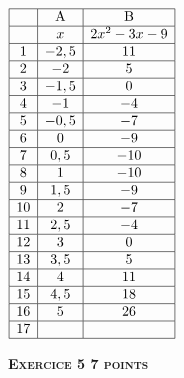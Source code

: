 \documentclass[10pt]{article}
\begin{document}
\parbox{0.3\linewidth}{$\begin{array}{|c|c|c|}\hline
	&\text{A}	&\text{B}\\ \hline
	&x			&2x^2 - 3x - 9\\ \hline
1	&- 2,5		&11\\ \hline
2	&- 2		&5\\ \hline
3	&- 1,5		&0\\ \hline
4	&- 1		&- 4\\ \hline
5	&- 0,5		&- 7\\ \hline
6	&0			&- 9\\ \hline
7	&0,5		&- 10\\ \hline
8	&1			&- 10\\ \hline
9	&1,5		&- 9\\ \hline
10	&2			&- 7\\ \hline
11	&2,5		&- 4\\ \hline
12	&3			&0\\ \hline
13	&3,5		&5\\ \hline
14	&4			&11\\ \hline
15	&4,5		&18\\ \hline
16	&5			&26\\ \hline
17	&			&\\ \hline
\end{array}$}

\bigskip

\textbf{\textsc{Exercice 5 \hfill 7 points}}

\medskip
\end{document}
